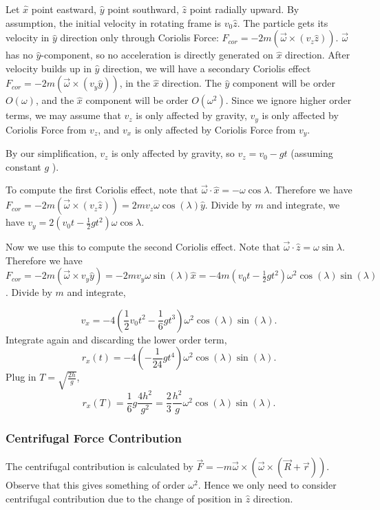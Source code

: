 Let $\hat{x} $ point eastward, $\hat{y} $ point southward, $\hat{z} $ point radially upward.
By assumption, the initial velocity in rotating frame is $v_0 \hat{z} $. The particle gets its velocity in $\hat{y} $ direction only through Coriolis Force: $F_{cor} = - 2 m (\vec{\omega}  \times (v_z \hat{z} ))$. $\vec{\omega} $ has no $\hat{y} $-component, so no acceleration is directly generated on $\hat{x} $ direction. After velocity builds up in $\hat{y} $ direction, we will have a secondary Coriolis effect $F_{cor} = -2m(\vec{\omega}  \times (v_y \hat{y} ))$, in the $\hat{x} $ direction. The $\hat{y} $ component will be order $O(\omega)$, and the $\hat{x} $ component will be order $O(\omega^2)$. Since we ignore higher order terms, we may assume that $v_z$ is only affected by gravity, $v_y$ is only affected by Coriolis Force from $v_z$, and $v_x$ is only affected by Coriolis Force from $v_y$.

By our simplification, $v_z$ is only affected by gravity, so $v_z = v_0 - g t$ (assuming constant  $g$ ).

To compute the first Coriolis effect, note that  $\vec{\omega} \cdot \hat{x} = -\omega\cos\lambda $. Therefore we have $F_{cor} = -2  m \left( \vec{\omega} \times (v_z \hat{z} ) \right) = 2 m v_z \omega \cos\left( \lambda  \right) \hat{y} $. Divide by $m$ and integrate, we have  $v_y = 2 (v_0 t - \frac{1}{2} g t^2) \omega \cos \lambda $.

Now we use this to compute the second Coriolis effect. Note that $\vec{\omega} \cdot \hat{z}  = \omega \sin \lambda$. Therefore we have $F_{cor } = - 2m (\vec{\omega} \times v_y \hat{y} ) = - 2 m v_y \omega \sin \left( \lambda \right)  \hat{x}  = - 4 m (v_0 t - \frac{1}{2} g t^2) \omega^2 \cos(\lambda) \sin(\lambda)$. Divide by $m$ and integrate,

\[
	v_x = - 4 \left( \frac{1}{2} v_0 t^2 - \frac{1}{6} g t^3 \right) \omega^2 \cos(\lambda) \sin(\lambda)
.\] 
Integrate again and discarding the lower order term,
\[
	r_x(t) = - 4 \left( - \frac{1}{24} g t^4 \right) \omega^2 \cos(\lambda) \sin(\lambda)
.\] 
Plug in $T = \sqrt{\frac{2h}{g}} $,
\[
	r_x(T) = \frac{1}{6} g \frac{4 h^2}{g^2} = \frac{2}{3} \frac{h^2}{g}  \omega^2 \cos(\lambda) \sin(\lambda)
.\] 

\subsubsection{Centrifugal Force Contribution}

The centrifugal contribution is calculated by $\vec{F} = - m \vec{\omega}  \times (\vec{\omega} \times (\vec{R} + \vec{r} ))$. Observe that this gives something of order $\omega^2$. Hence we only need to consider centrifugal contribution due to the change of position in $\hat{z} $ direction.

